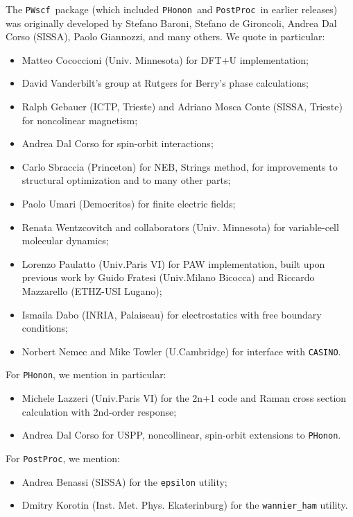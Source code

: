 \documentclass[12pt,a4paper]{article}
\def\PWscf{\texttt{PWscf}}
\def\PHonon{\texttt{PHonon}}
\def\PostProc{\texttt{PostProc}}
\begin{document}
The \PWscf\ package (which included \PHonon\ and \PostProc\
in earlier releases)
was originally developed by Stefano Baroni, Stefano
de Gironcoli, Andrea Dal Corso (SISSA), Paolo Giannozzi, and many others.
We quote in particular:
\begin{itemize}
  \item Matteo Cococcioni (Univ. Minnesota) for DFT+U implementation;
  \item David Vanderbilt's group at Rutgers for Berry's phase
  calculations;
  \item Ralph Gebauer (ICTP, Trieste) and Adriano Mosca Conte
  (SISSA, Trieste) for noncolinear magnetism;
  \item Andrea Dal Corso for spin-orbit interactions;
  \item Carlo Sbraccia (Princeton) for NEB, Strings method,
  for improvements to structural optimization
  and to many other parts;
  \item Paolo Umari (Democritos) for finite electric fields;
  \item Renata Wentzcovitch and collaborators (Univ. Minnesota)
  for variable-cell molecular dynamics;
  \item Lorenzo Paulatto (Univ.Paris VI) for PAW implementation, 
  built  upon previous work by Guido Fratesi (Univ.Milano Bicocca)
  and Riccardo Mazzarello (ETHZ-USI Lugano);
 \item Ismaila Dabo (INRIA, Palaiseau) for electrostatics with
 free boundary conditions;
 \item Norbert Nemec and Mike Towler (U.Cambridge) for interface with \texttt{CASINO}.
\end{itemize}
For \PHonon, we mention in particular: 
\begin{itemize}
  \item Michele Lazzeri (Univ.Paris VI) for the 2n+1 code and Raman 
  cross section calculation with 2nd-order response;
 \item Andrea Dal Corso for USPP, noncollinear, spin-orbit
 extensions to \PHonon.
 \end{itemize}
For \PostProc, we mention:
\begin{itemize}
\item Andrea Benassi (SISSA) for the \texttt{epsilon} utility;
\item Dmitry Korotin (Inst. Met. Phys. Ekaterinburg) for the
\texttt{wannier\_ham} utility.
\end{itemize}
\end{document}
